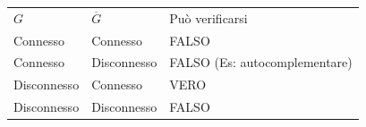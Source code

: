 \documentclass{article}
\begin{document}
{{{\begin{longtable}[]{@{}lll@{}}
\toprule
\begin{minipage}[t]{0.30\columnwidth}\raggedright\strut
$G$\strut
\end{minipage} & \begin{minipage}[t]{0.30\columnwidth}\raggedright\strut
$\overline{G}$\strut
\end{minipage} & \begin{minipage}[t]{0.30\columnwidth}\raggedright\strut
{Può verificarsi}\strut
\end{minipage}\tabularnewline
\begin{minipage}[t]{0.30\columnwidth}\raggedright\strut
{Connesso}\strut
\end{minipage} & \begin{minipage}[t]{0.30\columnwidth}\raggedright\strut
{Connesso}\strut
\end{minipage} & \begin{minipage}[t]{0.30\columnwidth}\raggedright\strut
{FALSO}\strut
\end{minipage}\tabularnewline
\begin{minipage}[t]{0.30\columnwidth}\raggedright\strut
{Connesso}\strut
\end{minipage} & \begin{minipage}[t]{0.30\columnwidth}\raggedright\strut
{Disconnesso}\strut
\end{minipage} & \begin{minipage}[t]{0.30\columnwidth}\raggedright\strut
{FALSO (Es: autocomplementare)}\strut
\end{minipage}\tabularnewline
\begin{minipage}[t]{0.30\columnwidth}\raggedright\strut
{Disconnesso}\strut
\end{minipage} & \begin{minipage}[t]{0.30\columnwidth}\raggedright\strut
{Connesso}\strut
\end{minipage} & \begin{minipage}[t]{0.30\columnwidth}\raggedright\strut
{VERO}\strut
\end{minipage}\tabularnewline
\begin{minipage}[t]{0.30\columnwidth}\raggedright\strut
{Disconnesso}\strut
\end{minipage} & \begin{minipage}[t]{0.30\columnwidth}\raggedright\strut
{Disconnesso}\strut
\end{minipage} & \begin{minipage}[t]{0.30\columnwidth}\raggedright\strut
{FALSO}\strut
\end{minipage}\tabularnewline
\bottomrule
\end{longtable}

}}}
\end{document}
